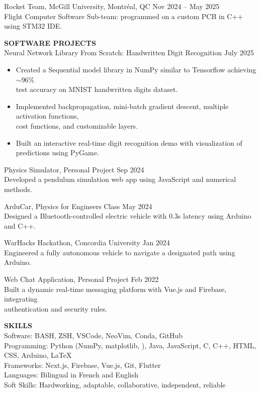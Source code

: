 \documentclass[11pt]{article}
\begin{document}
Rocket Team, McGill University, Montréal, QC \hfill Nov 2024 -- May 2025 \\
Flight Computer Software Sub-team: programmed on a custom PCB in C++ using STM32 IDE.

\vspace{1mm}
\textbf{SOFTWARE PROJECTS} \\
\vspace{1mm}
Neural Network Library From Scratch: Handwritten Digit Recognition \hfill July 2025
\vspace{-2mm}
\begin{itemize}
    \item Created a Sequential model library in NumPy similar to Tensorflow achieving $\sim$96\%\\ test accuracy on MNIST handwritten digits dataset.\\
    \item Implemented backpropagation, mini-batch gradient descent, multiple activation functions,\\ cost functions, and customizable layers.\\
    \item Built an interactive real-time digit recognition demo with visualization of predictions using PyGame.
\end{itemize}

Physics Simulator, Personal Project \hfill Sep 2024 \\
Developed a pendulum simulation web app using JavaScript and numerical methods.

ArduCar, Physics for Engineers Class \hfill May 2024 \\
Designed a Bluetooth-controlled electric vehicle with 0.3s latency using Arduino and C++.

WarHacks Hackathon, Concordia University \hfill Jan 2024 \\
Engineered a fully autonomous vehicle to navigate a designated path using Arduino.

Web Chat Application, Personal Project \hfill Feb 2022 \\
Built a dynamic real-time messaging platform with Vue.js and Firebase, integrating\\ authentication and security rules.

\vspace{1mm}
\textbf{SKILLS} \\
\vspace{1mm}
Software: BASH, ZSH, VSCode, NeoVim, Conda, GitHub \\
Programming: Python (NumPy, matplotlib, ), Java, JavaScript, C, C++, HTML, CSS, Arduino, LaTeX \\
Frameworks: Next.js, Firebase, Vue.js, Git, Flutter \\
Languages: Bilingual in French and English \\
Soft Skills: Hardworking, adaptable, collaborative, independent, reliable
\end{document}
